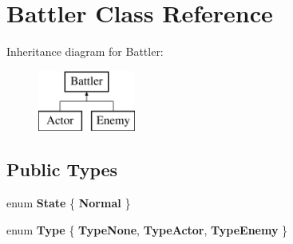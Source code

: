 \hypertarget{classBattler}{\section{Battler Class Reference}
\label{classBattler}
}
Inheritance diagram for Battler\-:\begin{figure}[H]
\begin{center}
\leavevmode
\includegraphics[height=2.000000cm]{classBattler}
\end{center}
\end{figure}
\subsection*{Public Types}
\begin{DoxyCompactItemize}
\item 
enum {\bfseries State} \{ {\bfseries Normal}
 \}
\item 
enum {\bfseries Type} \{ {\bfseries Type\-None}, 
{\bfseries Type\-Actor}, 
{\bfseries Type\-Enemy}
 \}
\end{DoxyCompactItemize}
